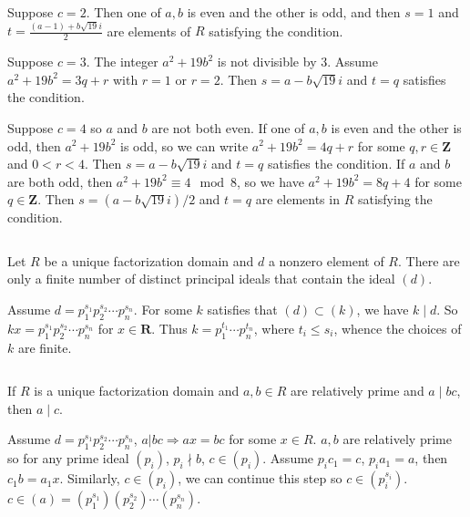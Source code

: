 \begin{answer}
    Suppose $c=2$. Then one of $a,b$ is even and the other is odd, and then $s=1$ and $t=\frac{(a-1)+b\sqrt{19}i}{2}$ are elements of $R$ satisfying the condition.
    
    Suppose $c=3$. The integer $a^{2}+19b^{2}$ is not divisible by 3. Assume $a^{2}+19b^{2}=3q+r$ with $r=1$ or $r=2$. Then $s=a-b\sqrt{19}i$ and $t=q$ satisfies the condition.

    Suppose $c=4$ so $a$ and $b$ are not both even. If one of $a,b$ is even and the other is odd, then $a^{2}+19b^{2}$ is odd, so we can write $a^{2}+19b^{2}=4q+r$ for some $q,r\in \mathbf{Z}$ and $0<r<4$. Then $s=a-b\sqrt{19}i$ and $t=q$ satisfies the condition. If $a$ and $b$ are both odd, then $a^{2}+19b^{2}\equiv 4\mod 8$, so we have $a^{2}+19b^{2}=8q+4$ for some $q\in\mathbf{Z}$. Then $s=(a-b\sqrt{19}i) /2$ and $t=q$ are elements in $R$ satisfying the condition.
\end{answer}

$$ $$

\begin{ex}
    Let $R$ be a unique factorization domain and $d$ a nonzero element of $R$. There are only a finite number of distinct principal ideals that contain the ideal $(d)$.
\end{ex}

\begin{answer}
    Assume $d=p_{1}^{s_{1}}p_{2}^{s_{2}}\cdots p_{n}^{s_{n}}$. For some $k$ satisfies that $(d)\subset (k)$, we have $k\mid d$. So $kx=p_{1}^{s_{1}}p_{2}^{s_{2}}\cdots p_{n}^{s_{n}}$ for $x\in\mathbf{R}$. Thus $k=p_{1}^{t_{1}}\cdots p_{n}^{t_{n}}$, where $t_{i}\leq s_{i}$, whence the choices of $k$ are finite.
\end{answer}

$$ $$

\begin{ex}
    If $R$ is a unique factorization domain and $a,b\in R$ are relatively prime and $a\mid bc$, then $a\mid c$.
\end{ex}

\begin{answer}
    Assume $d=p_{1}^{s_{1}}p_{2}^{s_{2}}\cdots p_{n}^{s_{n}}$, $a|bc\Rightarrow ax=bc$ for some $x\in R$. $a,b$ are relatively prime so for any prime ideal $(p_{i})$, $p_{i}\nmid b$, $c\in (p_{i})$. Assume $p_{i}c_{1}=c$, $p_{i}a_{1}=a$, then $c_{1}b=a_{1}x$. Similarly, $c\in (p_{i})$, we can continue this step so $c\in (p_{i}^{s_{i}})$. $c\in (a)=(p_{1}^{s_{1}})(p_{2}^{s_{2}})\cdots(p_{n}^{s_{n}})$.
\end{answer}

